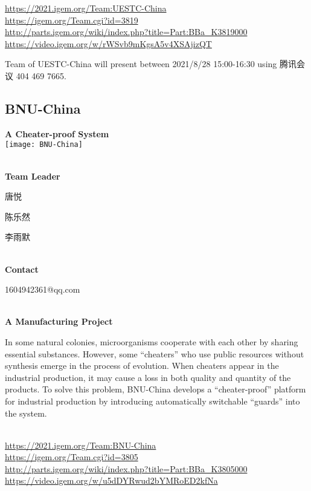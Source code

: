 \url{https://2021.igem.org/Team:UESTC-China }\\
\url{https://igem.org/Team.cgi?id=3819 }\\
\url{http://parts.igem.org/wiki/index.php?title=Part:BBa_K3819000 }\\
\url{https://video.igem.org/w/rWSvb9mKgsA5v4XSAjizQT }\\

\vfill{}









Team of UESTC-China will present between       2021/8/28 15:00-16:30  using 腾讯会议 404 469 7665.
\newpage


\subsection{\textcolor{Blu}{ BNU-China } }
\vspace{5mm}
\begin{center}
\large{
  \textbf{ A Cheater-proof System }\\

  \texttt{[image: BNU-China]}
}
\end{center}
\textbf{\\Team Leader}

  唐悦

  陈乐然

  李雨默


\textbf{\\Contact}

  1604942361@qq.com


\textbf{\\A Manufacturing Project\\}\begin{spacing}{1.5}

In some natural colonies, microorganisms cooperate with each other by sharing essential substances. However, some “cheaters” who use public resources without synthesis emerge in the process of evolution. When cheaters appear in the industrial production, it may cause a loss in both quality and quantity of the products. To solve this problem, BNU-China develops a “cheater-proof” platform for industrial production by introducing automatically switchable “guards” into the system.\end{spacing}
\\

\url{https://2021.igem.org/Team:BNU-China }\\
\url{https://igem.org/Team.cgi?id=3805 }\\
\url{http://parts.igem.org/wiki/index.php?title=Part:BBa_K3805000 }\\
\url{https://video.igem.org/w/u5dDYRwud2bYMRoED2kfNa }\\

